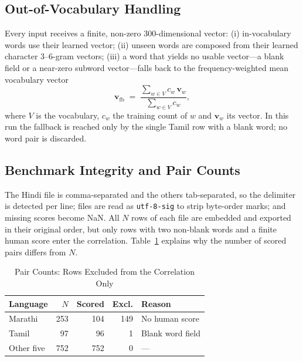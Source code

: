 \documentclass[conference,10pt]{IEEEtran}
\begin{document}
\subsection{Out-of-Vocabulary Handling}\label{sec:oov}
Every input receives a finite, non-zero 300-dimensional vector: (i) in-vocabulary words use their learned vector; (ii) unseen words are composed from their learned character 3--6-gram vectors; (iii) a word that yields no usable vector---a blank field or a near-zero subword vector---falls back to the frequency-weighted mean vocabulary vector
\begin{equation}
\mathbf{v}_{\text{fb}} \;=\; \frac{\sum_{w \in V} c_w\,\mathbf{v}_w}{\sum_{w \in V} c_w},
\label{eq:fallback}
\end{equation}
where $V$ is the vocabulary, $c_w$ the training count of $w$ and $\mathbf{v}_w$ its vector. In this run the fallback is reached only by the single Tamil row with a blank word; no word pair is discarded.

\subsection{Benchmark Integrity and Pair Counts}\label{sec:integrity}
The Hindi file is comma-separated and the others tab-separated, so the delimiter is detected per line; files are read as \texttt{utf-8-sig} to strip byte-order marks; and missing scores become NaN. All $N$ rows of each file are embedded and exported in their original order, but only rows with two non-blank words and a finite human score enter the correlation. Table~\ref{tab:integrity} explains why the number of scored pairs differs from $N$.

\begin{table}[!t]
\caption{Pair Counts: Rows Excluded from the Correlation Only}
\label{tab:integrity}
\centering
\renewcommand{\arraystretch}{1.2}
\footnotesize
\setlength{\tabcolsep}{4pt}
\begin{tabular}{|l|r|r|r|p{2.3cm}|}
\hline
\rowcolor{srcblue!15}
\textbf{Language} & \textbf{$N$} & \textbf{Scored} & \textbf{Excl.} & \textbf{Reason} \\
\hline
Marathi & 253 & 104 & 149 & No human score \\
\hline
Tamil & 97 & 96 & 1 & Blank word field \\
\hline
Other five & 752 & 752 & 0 & --- \\
\hline
\end{tabular}
\end{table}
\end{document}
